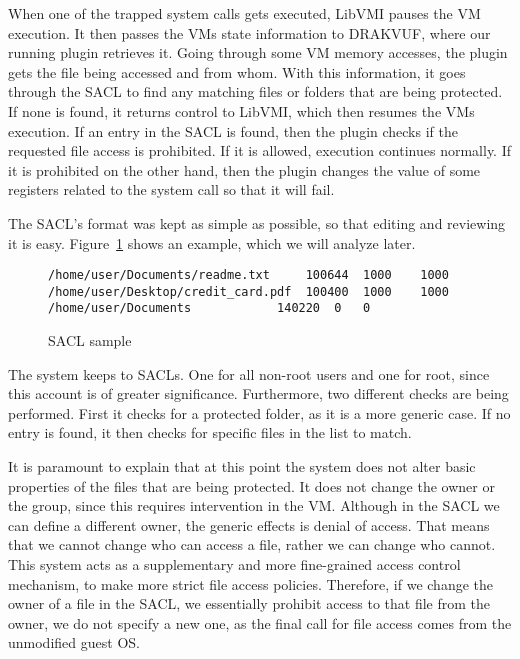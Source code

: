 \par When one of the trapped system calls gets executed, LibVMI pauses the \ac{VM} execution. It then passes the \ac{VM}s state information to DRAKVUF, where our running plugin retrieves it. Going through some \ac{VM} memory accesses, the plugin gets the file being accessed and from whom. With this information, it goes through the \ac{SACL} to find any matching files or folders that are being protected. If none is found, it returns control to LibVMI, which then resumes the \ac{VM}s execution. If an entry in the \ac{SACL} is found, then the plugin checks if the requested file access is prohibited. If it is allowed, execution continues normally. If it is prohibited on the other hand, then the plugin changes the value of some registers related to the system call so that it will fail.

\par The \ac{SACL}'s format was kept as simple as possible, so that editing and reviewing it is easy. Figure~\ref{fig:sacl} shows an example, which we will analyze later.

\begin{figure}[ht]
	\centering
	\begin{lstlisting}
/home/user/Documents/readme.txt		100644	1000	1000
/home/user/Desktop/credit_card.pdf	100400	1000	1000
/home/user/Documents			140220	0	0
	\end{lstlisting}
	\caption{\ac{SACL} sample}
	\label{fig:sacl}
\end{figure}

\par The system keeps to \ac{SACL}s. One for all non-root users and one for root, since this account is of greater significance. Furthermore, two different checks are being performed. First it checks for a protected folder, as it is a more generic case. If no entry is found, it then checks for specific files in the list to match.

\par It is paramount to explain that at this point the system does not alter basic properties of the files that are being protected. It does not change the owner or the group, since this requires intervention in the \ac{VM}. Although in the \ac{SACL} we can define a different owner, the generic effects is denial of access. That means that we cannot change who can access a file, rather we can change who cannot. This system acts as a supplementary and more fine-grained access control mechanism, to make more strict file access policies. Therefore, if we change the owner of a file in the \ac{SACL}, we essentially prohibit access to that file from the owner, we do not specify a new one, as the final call for file access comes from the unmodified guest \ac{OS}.

